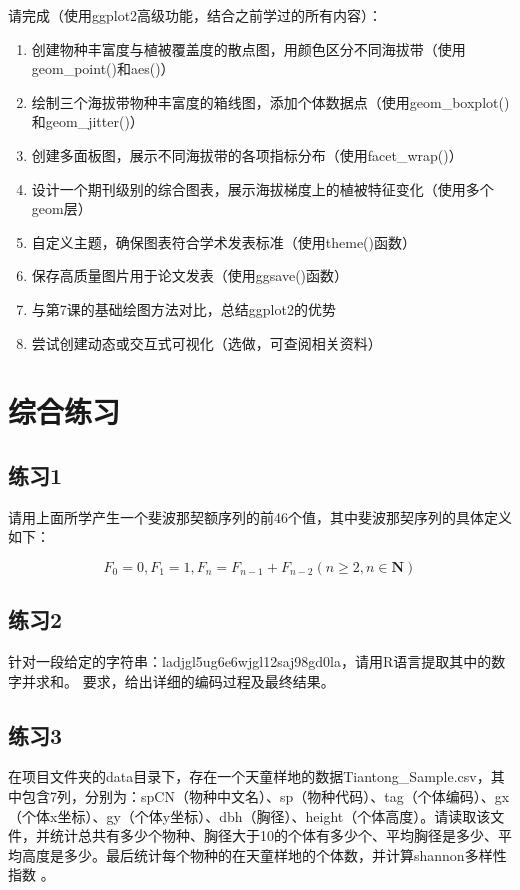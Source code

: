 \documentclass[
]{book}
\begin{document}
请完成（使用ggplot2高级功能，结合之前学过的所有内容）：

\begin{enumerate}
\def\labelenumi{\arabic{enumi}.}
\item
  创建物种丰富度与植被覆盖度的散点图，用颜色区分不同海拔带（使用geom\_point()和aes()）
\item
  绘制三个海拔带物种丰富度的箱线图，添加个体数据点（使用geom\_boxplot()和geom\_jitter()）
\item
  创建多面板图，展示不同海拔带的各项指标分布（使用facet\_wrap()）
\item
  设计一个期刊级别的综合图表，展示海拔梯度上的植被特征变化（使用多个geom层）
\item
  自定义主题，确保图表符合学术发表标准（使用theme()函数）
\item
  保存高质量图片用于论文发表（使用ggsave()函数）
\item
  与第7课的基础绘图方法对比，总结ggplot2的优势
\item
  尝试创建动态或交互式可视化（选做，可查阅相关资料）
\end{enumerate}

\hypertarget{ux7efcux5408ux7ec3ux4e60}{%
\section{综合练习}\label{ux7efcux5408ux7ec3ux4e60}}

\hypertarget{ux7ec3ux4e601}{%
\subsection{练习1}\label{ux7ec3ux4e601}}

请用上面所学产生一个斐波那契额序列的前46个值，其中斐波那契序列的具体定义如下：

\[F_0=0, F_1=1, F_n=F_{n-1}+F_{n-2} (n \ge 2,n \in \mathbf{N})\]

\hypertarget{ux7ec3ux4e602}{%
\subsection{练习2}\label{ux7ec3ux4e602}}

针对一段给定的字符串：ladjgl5ug6e6wjgl12saj98gd0la，请用R语言提取其中的数字并求和。
要求，给出详细的编码过程及最终结果。

\hypertarget{ux7ec3ux4e603}{%
\subsection{练习3}\label{ux7ec3ux4e603}}

在项目文件夹的data目录下，存在一个天童样地的数据Tiantong\_Sample.csv，其中包含7列，分别为：spCN（物种中文名）、sp（物种代码）、tag（个体编码）、gx（个体x坐标）、gy（个体y坐标）、dbh（胸径）、height（个体高度）。请读取该文件，并统计总共有多少个物种、胸径大于10的个体有多少个、平均胸径是多少、平均高度是多少。最后统计每个物种的在天童样地的个体数，并计算shannon多样性指数 。

  
\end{document}
